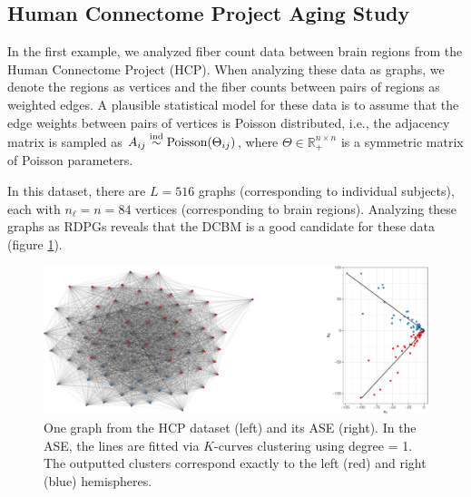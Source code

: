 \documentclass[12pt]{article}
\begin{document}
\hypertarget{human-connectome-project-aging-study}{%
\subsection{Human Connectome Project Aging
Study}\label{human-connectome-project-aging-study}}

In the first example, we analyzed fiber count data between brain regions
from the Human Connectome Project (HCP). When analyzing these data as
graphs, we denote the regions as vertices and the fiber counts between
pairs of regions as weighted edges. A plausible statistical model for
these data is to assume that the edge weights between pairs of vertices
is Poisson distributed, i.e., the adjacency matrix is sampled as
\(A_{ij} \stackrel{\mathrm{ind}}{\sim} \mathrm{Poisson}(\Theta_{ij})\), where
\(\Theta \in \mathbb{R}_+^{n \times n}\) is a symmetric matrix of
Poisson parameters.

In this dataset, there are \(L = 516\) graphs (corresponding to
individual subjects), each with \(n_\ell = n = 84\) vertices
(corresponding to brain regions). Analyzing these graphs as RDPGs
reveals that the DCBM is a good candidate for these data (figure
\ref{fig:hcp-ase}).

\begin{figure}[H]

{\centering \includegraphics[width=1\linewidth]{draft_files/figure-latex/hcp-ase-1} 

}

\caption{One graph from the HCP dataset (left) and its ASE (right). In the ASE, the lines are fitted via $K$-curves clustering using degree = 1. The outputted clusters correspond exactly to the left (red) and right (blue) hemispheres.}\label{fig:hcp-ase}
\end{figure}
\end{document}
